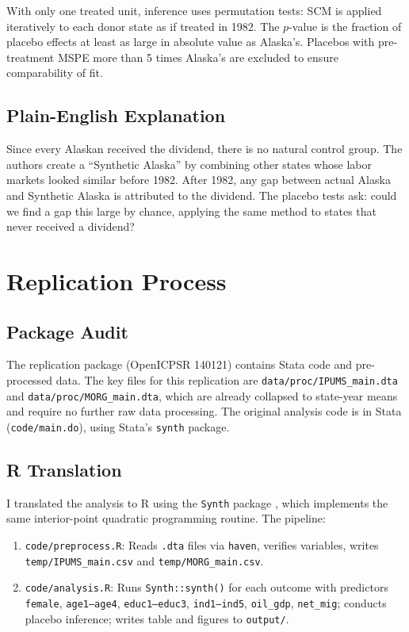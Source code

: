 \documentclass[12pt]{article}
\begin{document}
With only one treated unit, inference uses permutation tests: SCM is applied iteratively to each donor state as if treated in 1982. The $p$-value is the fraction of placebo effects at least as large in absolute value as Alaska's. Placebos with pre-treatment MSPE more than 5 times Alaska's are excluded to ensure comparability of fit.

\subsection{Plain-English Explanation}

Since every Alaskan received the dividend, there is no natural control group. The authors create a ``Synthetic Alaska'' by combining other states whose labor markets looked similar before 1982. After 1982, any gap between actual Alaska and Synthetic Alaska is attributed to the dividend. The placebo tests ask: could we find a gap this large by chance, applying the same method to states that never received a dividend?

\section{Replication Process}

\subsection{Package Audit}

The replication package (OpenICPSR 140121) contains Stata code and pre-processed data. The key files for this replication are \texttt{data/proc/IPUMS\_main.dta} and \texttt{data/proc/MORG\_main.dta}, which are already collapsed to state-year means and require no further raw data processing. The original analysis code is in Stata (\texttt{code/main.do}), using Stata's \texttt{synth} package.

\subsection{R Translation}

I translated the analysis to R using the \texttt{Synth} package \citep{abadie2011synth}, which implements the same interior-point quadratic programming routine. The pipeline:
\begin{enumerate}
  \item \texttt{code/preprocess.R}: Reads \texttt{.dta} files via \texttt{haven}, verifies variables, writes \texttt{temp/IPUMS\_main.csv} and \texttt{temp/MORG\_main.csv}.
  \item \texttt{code/analysis.R}: Runs \texttt{Synth::synth()} for each outcome with predictors \texttt{female}, \texttt{age1--age4}, \texttt{educ1--educ3}, \texttt{ind1--ind5}, \texttt{oil\_gdp}, \texttt{net\_mig}; conducts placebo inference; writes table and figures to \texttt{output/}.
\end{enumerate}
\end{document}
